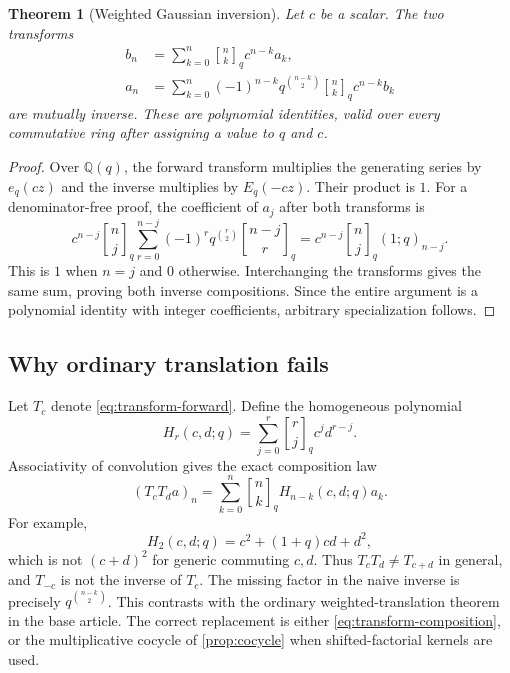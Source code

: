 \documentclass[11pt,a4paper]{article}
\numberwithin{equation}{section}
\newtheorem{theorem}{Theorem}[section]
\theoremstyle{definition}
\theoremstyle{remark}
\newcommand{\Q}{\mathbb Q}
\newcommand{\qb}[2]{\genfrac{[}{]}{0pt}{}{#1}{#2}_{q}}
\newcommand{\poch}[3]{(#1;#2)_{#3}}
\begin{document}
\begin{theorem}[Weighted Gaussian inversion]\label{thm:transform}
Let $c$ be a scalar. The two transforms
\begin{align}
 b_n&=\sum_{k=0}^n\qb nk c^{n-k}a_k,\label{eq:transform-forward}\\
 a_n&=\sum_{k=0}^n(-1)^{n-k}q^{\binom{n-k}2}\qb nk c^{n-k}b_k
 \label{eq:transform-inverse}
\end{align}
are mutually inverse. These are polynomial identities, valid over every
commutative ring after assigning a value to $q$ and $c$.
\end{theorem}
\begin{proof}
Over $\Q(q)$, the forward transform multiplies the generating series by
$e_q(cz)$ and the inverse multiplies by $E_q(-cz)$. Their product is $1$.
For a denominator-free proof, the coefficient of $a_j$ after both transforms is
\[
 c^{n-j}\qb nj
 \sum_{r=0}^{n-j}(-1)^r q^{\binom r2}\qb{n-j}r
 =c^{n-j}\qb nj\poch1q{n-j}.
\]
This is $1$ when $n=j$ and $0$ otherwise. Interchanging the transforms gives the
same sum, proving both inverse compositions. Since the entire argument is a
polynomial identity with integer coefficients, arbitrary specialization follows.
\end{proof}

\subsection{Why ordinary translation fails}
Let $T_c$ denote \eqref{eq:transform-forward}. Define the homogeneous polynomial
\[
 H_r(c,d;q)=\sum_{j=0}^r\qb rj c^j d^{r-j}.
\]
Associativity of convolution gives the exact composition law
\begin{equation}\label{eq:transform-composition}
 (T_cT_d a)_n=\sum_{k=0}^n\qb nk H_{n-k}(c,d;q)a_k.
\end{equation}
For example,
\[
 H_2(c,d;q)=c^2+(1+q)cd+d^2,
\]
which is not $(c+d)^2$ for generic commuting $c,d$. Thus
$T_cT_d\ne T_{c+d}$ in general, and $T_{-c}$ is not the inverse of $T_c$.
The missing factor in the naive inverse is precisely $q^{\binom{n-k}2}$.
This contrasts with the ordinary weighted-translation theorem in the base article.
The correct replacement is either \eqref{eq:transform-composition}, or the
multiplicative cocycle of \cref{prop:cocycle} when shifted-factorial kernels are used.
\end{document}
